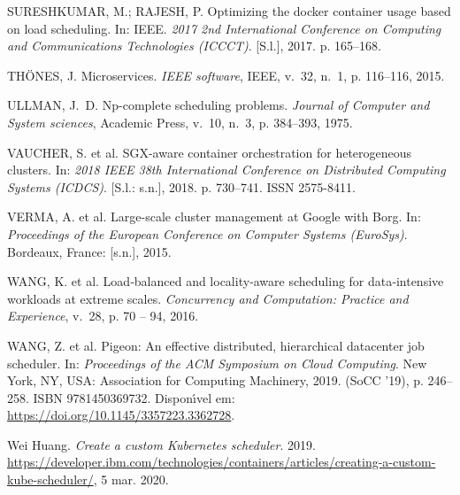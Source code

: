 \documentclass[
	12pt,				%
	openright,			%
	oneside,			%
	a4paper,			%
	brazil				%
	]{abntex2}
\begin{document}
\begin{thebibliography}{}
{SURESHKUMAR, M.; RAJESH, P. Optimizing the docker container usage based on
  load scheduling. In:  IEEE. \emph{2017 2nd International Conference on
  Computing and Communications Technologies (ICCCT)}. [S.l.], 2017. p.
  165--168.}

{TH{\"O}NES, J. Microservices.
\emph{IEEE software}, IEEE, v.~32, n.~1, p. 116--116, 2015.}

{ULLMAN, J.~D. Np-complete scheduling problems.
\emph{Journal of Computer and System sciences}, Academic Press, v.~10, n.~3, p.
  384--393, 1975.}

{VAUCHER, S. et al. {SGX}-aware container orchestration for heterogeneous
  clusters. In:  \emph{2018 IEEE 38th International Conference on Distributed
  Computing Systems (ICDCS)}. [S.l.: s.n.], 2018. p. 730--741.
ISSN 2575-8411.}

{VERMA, A. et al. Large-scale cluster management at {Google} with {Borg}. In:
  \emph{Proceedings of the European Conference on Computer Systems (EuroSys)}.
  Bordeaux, France: [s.n.], 2015.}

{WANG, K. et al. Load‐balanced and locality‐aware scheduling for
  data‐intensive workloads at extreme scales.
\emph{Concurrency and Computation: Practice and Experience}, v.~28, p. 70 --
  94, 2016.}

{WANG, Z. et al. Pigeon: An effective distributed, hierarchical datacenter job
  scheduler. In:  \emph{Proceedings of the ACM Symposium on Cloud Computing}.
  New York, NY, USA: Association for Computing Machinery, 2019.  (SoCC '19), p.
  246–258.
ISBN 9781450369732. Dispon{\'\i}vel em:
  \url{https://doi.org/10.1145/3357223.3362728}.}

{{Wei Huang}. \emph{Create a custom Kubernetes scheduler}. 2019.
\url{https://developer.ibm.com/technologies/containers/articles/creating-a-custom-kube-scheduler/},
  5 mar. 2020.}


\end{thebibliography}
\end{document}
